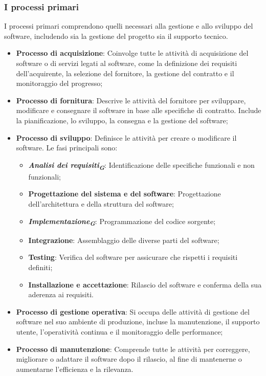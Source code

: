 \subsubsection{I processi primari}
I processi primari comprendono quelli necessari alla gestione e allo sviluppo del software, includendo sia la gestione del progetto sia il supporto tecnico.
\begin{itemize}
    \item \textbf{Processo di acquisizione}: Coinvolge tutte le attività di acquisizione del software o di servizi legati al software, come la definizione dei requisiti dell'acquirente, la selezione del fornitore, la gestione del contratto e il monitoraggio del progresso;
    \item \textbf{Processo di fornitura}: Descrive le attività del fornitore per sviluppare, modificare e consegnare il software in base alle specifiche di contratto. Include la pianificazione, lo sviluppo, la consegna e la gestione del software;
    \item \textbf{Processo di sviluppo}: Definisce le attività per creare o modificare il software. Le fasi principali sono:
    \begin{itemize}
        \item \textbf{\emph{Analisi dei requisiti}\textsubscript{\textit{\textbf{G}}}}: Identificazione delle specifiche funzionali e non funzionali;
        \item \textbf{Progettazione del sistema e del software}: Progettazione dell'architettura e della struttura del software;
        \item \textbf{\emph{Implementazione}\textsubscript{\textit{\textbf{G}}}}: Programmazione del codice sorgente;
        \item \textbf{Integrazione}: Assemblaggio delle diverse parti del software;
        \item \textbf{Testing}: Verifica del software per assicurare che rispetti i requisiti definiti;
        \item \textbf{Installazione e accettazione}: Rilascio del software e conferma della sua aderenza ai requisiti.
    \end{itemize}
    \item \textbf{Processo di gestione operativa}: Si occupa delle attività di gestione del software nel suo ambiente di produzione, incluse la manutenzione, il supporto utente, l'operatività continua e il monitoraggio delle performance;
    \item \textbf{Processo di manutenzione}: Comprende tutte le attività per correggere, migliorare o adattare il software dopo il rilascio, al fine di mantenerne o aumentarne l'efficienza e la rilevanza.
\end{itemize}

